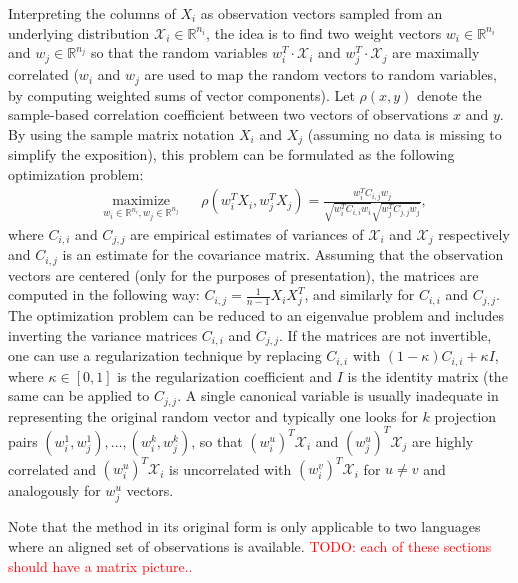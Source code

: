 \documentclass[twoside,11pt]{article}
\newcommand{\todo}[1]{\textcolor{red}{TODO: #1}}
\newcommand{\RR}{\mathbb{R}}
\begin{document}
Interpreting the columns of $X_i$ as observation vectors sampled from an underlying distribution $\mathcal{X}_i \in \RR^{n_i}$, the idea is to find two weight vectors $w_i \in \RR^{n_i}$ and $w_j \in \RR^{n_j}$ so that the random variables $w_i^T \cdot \mathcal{X}_i$ and $w_j^T \cdot \mathcal{X}_j$ are maximally correlated ($w_i$ and $w_j$ are used to map the random vectors to random variables, by computing weighted sums of vector components). Let $\rho(x,y)$ denote the sample-based correlation coefficient between two vectors of observations $x$ and $y$. By using the sample matrix notation $X_i$ and $X_j$ (assuming no data is missing to simplify the exposition), this problem can be formulated as the following optimization problem:
\begin{equation*}
\begin{aligned}
& \underset{w_i \in \RR^{n_i}, w_j \in \RR^{n_j}}{\text{maximize}}
& & \rho(w_i^T X_i , w_j^T X_j) = \frac{w_i^T C_{i,j} w_j}{\sqrt{w_i^T C_{i,i} w_i} \sqrt{w_j^T C_{j,j} w_j}},
\end{aligned}
\end{equation*}
where $C_{i,i}$ and $C_{j,j}$ are empirical estimates of variances of $\mathcal{X}_i$ and $\mathcal{X}_j$ respectively and $C_{i,j}$ is an estimate for the covariance matrix. Assuming that the observation vectors are centered (only for the purposes of presentation), the matrices are computed in the following way: $C_{i,j} = \frac{1}{n-1}X_i X_j^T$, and similarly for $C_{i,i}$ and $C_{j,j}$.
The optimization problem can be reduced to an eigenvalue problem and includes inverting the variance matrices $C_{i,i}$ and $C_{j,j}$. If the matrices are not invertible, one can use a regularization technique by replacing $C_{i,i}$ with $(1- \kappa)C_{i,i} + \kappa I$, where $\kappa \in [0,1]$ is the regularization coefficient and $I$ is the identity matrix (the same can be applied to $C_{j,j}$.
A single canonical variable is usually inadequate in representing the original random vector and typically one looks for $k$ projection pairs $(w_i^1, w_j^1),\ldots,(w_i^k, w_j^k)$, so that $(w_i^{u})^T \mathcal{X}_i$ and $(w_j^{u})^T \mathcal{X}_j$ are highly correlated and $(w_i^{u})^T \mathcal{X}_i$ is uncorrelated with $(w_i^{v})^T \mathcal{X}_i$  for $u \neq v$ and analogously for $w_j^u$ vectors.

Note that the method in its original form is only applicable to two languages where an aligned set of observations is available.
\todo{each of these sections should have a matrix picture..}
\end{document}
